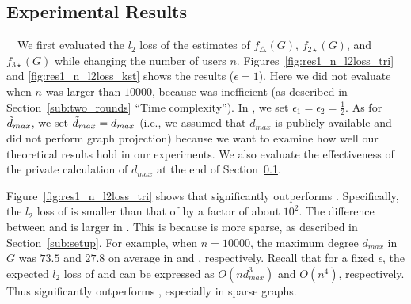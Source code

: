\subsection{Experimental Results}
\label{sub:results}
~~We first evaluated the $l_2$ loss of the estimates of 
$f_\triangle(G)$, 
$f_{2\star}(G)$, 
and $f_{3\star}(G)$ 
while changing the number of users $n$. 
Figures~\ref{fig:res1_n_l2loss_tri} and \ref{fig:res1_n_l2loss_kst} shows the results ($\epsilon=1$). 
Here 
we did not evaluate  when $n$ was larger than $10000$, because  was inefficient 
(as described in Section~\ref{sub:two_rounds} ``Time complexity''). 
In , we set $\epsilon_1 = \epsilon_2 = \frac{1}{2}$. 
As for $\tilde{d}_{max}$, 
we set $\tilde{d}_{max} = d_{max}$ (i.e., we assumed that $d_{max}$ is publicly available and did not perform graph projection) 
because we want to examine how well our theoretical results hold in our experiments. 
We also evaluate the effectiveness of the private calculation of $d_{max}$ at the end of Section~\ref{sub:results}. 

Figure~\ref{fig:res1_n_l2loss_tri} shows that  significantly outperforms . 
Specifically, the $l_2$ loss of  is smaller than that of  by a factor of about $10^2$. 
The difference between  and  is larger in \Orkut{}. 
This is because \Orkut{} is more sparse, as described in Section~\ref{sub:setup}. 
For example, when $n=10000$, the maximum degree $d_{max}$ in $G$ was $73.5$ and $27.8$ on average in \IMDB{} and \Orkut{}, respectively. 
Recall that for a fixed $\epsilon$, 
the expected $l_2$ loss of  and  
can be expressed as $O(nd_{max}^3)$ and $O(n^4)$, respectively. 
Thus  significantly outperforms , especially in sparse graphs. 

